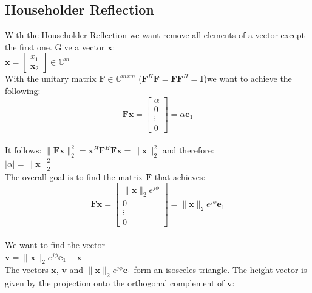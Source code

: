 \documentclass[english]{latex4ei/latex4ei_sheet}
\begin{document}
\begin{sectionbox}
    \subsection{Householder Reflection}
    With the Householder Reflection we want remove all elements of a vector except the first one. Give a vector $\mathbf{x}$:\\
    $\mathbf{x} = \begin{bmatrix}
            x_1 \\
            \mathbf{x}_2
        \end{bmatrix}\in\mathbb{C}^m$\\

    With the unitary matrix $\mathbf{F}\in\mathbb{C}^{mxm}$ ($\mathbf{F}^H\mathbf{F}=\mathbf{F}\mathbf{F}^H = \mathbf{I}$)we want to achieve the following:\\
    $$\mathbf{F}\mathbf{x} = \begin{bmatrix}
            \alpha \\
            0      \\
            \vdots \\
            0
        \end{bmatrix} = \alpha \mathbf{e}_1$$\\
    It follows: $\parallel\mathbf{F}\mathbf{x}\parallel_2^2 = \mathbf{x}^H\mathbf{F}^H\mathbf{F}\mathbf{x} = \parallel \mathbf{x}\parallel_2^2$ and therefore:\\
    $|\alpha| = \parallel \mathbf{x}\parallel_2^2$\\
    The overall goal is to find the matrix $\mathbf{F}$ that achieves:
    $$\mathbf{F}\mathbf{x} = \begin{bmatrix}
            \parallel \mathbf{x}\parallel_2 e^{j\phi} \\
            0                                         \\
            \vdots                                    \\
            0
        \end{bmatrix} = \parallel \mathbf{x}\parallel_2 e^{j\phi} \mathbf{e}_1$$\\
    We want to find the vector\\

    $\mathbf{v} = \parallel\mathbf{x}\parallel_2 e^{j\phi}\mathbf{e}_1 - \mathbf{x}$\\

    The vectors $\mathbf{x}$, $\mathbf{v}$ and $\parallel\mathbf{x}\parallel_2 e^{j\phi}\mathbf{e}_1$ form an isosceles triangle. The height vector is given by the projection onto the orthogonal complement of $\mathbf{v}$:


\end{sectionbox}
\end{document}
